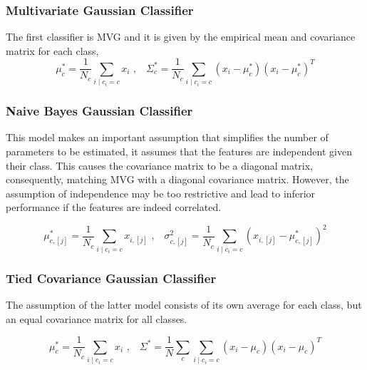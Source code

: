 
\subsubsection{Multivariate Gaussian Classifier}
\label{subsubsec:multivariateGaussianClassifier}
The first classifier is MVG and it is given by the empirical mean and covariance matrix for each class,
\begin{equation}
    \mu_c^* = \frac{1}{N_c} \sum_{i\mid c_i=c} x_i\text{ ,}\quad
    \Sigma_c^* = \frac{1}{N_c} \sum_{i\mid c_i=c} (x_i - \mu_c^*)(x_i - \mu_c^*)^T
    \label{eq:meanAndVarianceMVG}
\end{equation}


\subsubsection{Naive Bayes Gaussian Classifier}
\label{subsubsec:naiveBayesGaussianClassifier}
This model makes an important assumption that simplifies the number of parameters to be estimated,
it assumes that the features are independent given their class.
This causes the covariance matrix to be a diagonal matrix, consequently, matching MVG with a diagonal covariance matrix.
However, the assumption of independence may be too restrictive and lead to inferior performance if the features are indeed correlated.

\begin{equation}
    \mu_{c,[j]}^* = \frac{1}{N_c} \sum_{i\mid c_i = c} x_{i,[j]}\text{ ,}\quad
    \sigma_{c,[j]}^2 = \frac{1}{N_c} \sum_{i\mid c_i = c} (x_{i,[j]} - \mu_{c,[j]}^*)^2
    \label{eq:meanAndVarianceNBG}
\end{equation}


\subsubsection{Tied Covariance Gaussian Classifier}
\label{subsubsec:tiedCovarianceGaussianClassifier}
The assumption of the latter model consists of its own average for each class, but an equal covariance matrix for all classes.

\begin{equation}
    \mu_c^* = \frac{1}{N_c} \sum_{i\mid c_i=c} x_i\text{ ,}\quad
    \Sigma^* = \frac{1}{N} \sum_{c} \sum_{i\mid c_i = c} (x_{i} - \mu_c)(x_{i} - \mu_c)^T
    \label{eq:tiedCovariance}
\end{equation}

